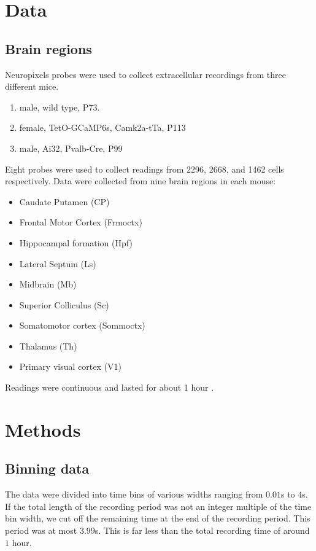 \documentclass[a4paper,12pt]{article}
\theoremstyle{definition}
\begin{document}

\section{Data}
    \subsection{Brain regions}
    Neuropixels probes were used to collect extracellular recordings \cite{jun} from three different mice. 
    \begin{enumerate}
        \item male, wild type, P73. %
        \item female, TetO-GCaMP6s, Camk2a-tTa, P113 %
        \item male, Ai32, Pvalb-Cre, P99 %
    \end{enumerate}
    Eight probes were used to collect readings from 2296, 2668, and 1462 cells respectively. Data were collected from nine brain regions in each mouse:
    \begin{itemize}
        \item Caudate Putamen (CP)
        \item Frontal Motor Cortex (Frmoctx)
        \item Hippocampal formation (Hpf)
        \item Lateral Septum (Ls)
        \item Midbrain (Mb)
        \item Superior Colliculus (Sc)
        \item Somatomotor cortex (Sommoctx)
        \item Thalamus (Th)
        \item Primary visual cortex (V1)
    \end{itemize}
    Readings were continuous and lasted for about 1 hour \cite{stringer}.

\section{Methods}
    \subsection{Binning data}
    The data were divided into time bins of various widths ranging from $0.01$s to $4$s. If the total length of the recording period was not an integer multiple of the time bin width, we cut off the remaining time at the end of the recording period. This period was at most $3.99$s. This is far less than the total recording time of around $1$ hour.
\end{document}
